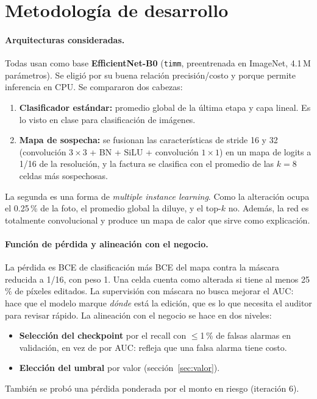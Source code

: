 \documentclass[11pt,letterpaper]{article}
\begin{document}
\section{Metodología de desarrollo}
\label{sec:metodo}

\paragraph{Arquitecturas consideradas.} Todas usan como base \textbf{EfficientNet-B0} (\texttt{timm}, preentrenada en ImageNet, 4.1\,M parámetros). Se eligió por su buena relación precisión/costo y porque permite inferencia en CPU. Se compararon dos cabezas:
\begin{enumerate}
  \item \textbf{Clasificador estándar:} promedio global de la última etapa y capa lineal. Es lo visto en clase para clasificación de imágenes.
  \item \textbf{Mapa de sospecha:} se fusionan las características de stride 16 y 32 (convolución $3\times3$ + BN + SiLU + convolución $1\times1$) en un mapa de logits a 1/16 de la resolución, y la factura se clasifica con el promedio de las $k=8$ celdas más sospechosas.
\end{enumerate}
La segunda es una forma de \emph{multiple instance learning}. Como la alteración ocupa el 0.25\,\% de la foto, el promedio global la diluye, y el top-$k$ no. Además, la red es totalmente convolucional y produce un mapa de calor que sirve como explicación.

\paragraph{Función de pérdida y alineación con el negocio.} La pérdida es BCE de clasificación más BCE del mapa contra la máscara reducida a 1/16, con peso 1. Una celda cuenta como alterada si tiene al menos 25\,\% de píxeles editados. La supervisión con máscara no busca mejorar el AUC: hace que el modelo marque \emph{dónde} está la edición, que es lo que necesita el auditor para revisar rápido. La alineación con el negocio se hace en dos niveles:
\begin{itemize}
  \item \textbf{Selección del checkpoint} por el recall con $\le$1\,\% de falsas alarmas en validación, en vez de por AUC: refleja que una falsa alarma tiene costo.
  \item \textbf{Elección del umbral} por valor (sección~\ref{sec:valor}).
\end{itemize}
También se probó una pérdida ponderada por el monto en riesgo (iteración 6).
\end{document}
